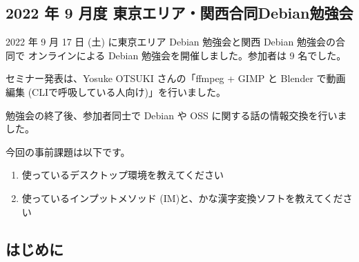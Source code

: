 \documentclass[mingoth,a4paper]{jsarticle}
\begin{document}

\subsection{2022 年 9 月度 東京エリア・関西合同Debian勉強会}

2022 年 9 月 17 日 (土) に東京エリア Debian 勉強会と関西 Debian 勉強会の合同で
オンラインによる Debian 勉強会を開催しました。参加者は 9 名でした。

セミナー発表は、Yosuke OTSUKI さんの「ffmpeg + GIMP と Blender で動画編集 (CLIで呼吸している人向け)」を行いました。


勉強会の終了後、参加者同士で Debian や OSS に関する話の情報交換を行いました。


今回の事前課題は以下です。

\begin{enumerate}
\item 使っているデスクトップ環境を教えてください
\item 使っているインプットメソッド (IM)と、かな漢字変換ソフトを教えてください
\end{enumerate}


\begin{multicols}{2}
{\small

}
\end{multicols}

%
%
%
%


      

\subsection{はじめに}
\end{document}
